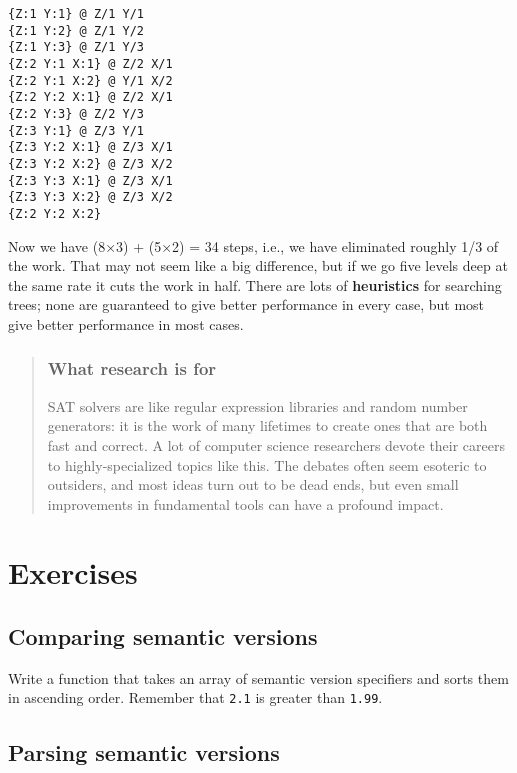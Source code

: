 \documentclass[krantzl]{krantz}
\newcommand{\glossref}[1]{\textbf{#1}}
\newenvironment{callout}{\savenotes\begin{tBox}\begin{quotation}\toggletrue{inbox}\renewcommand{\thempfootnote}{\arabic{footnote}}}{\end{quotation}\vspace{\baselineskip}\end{tBox}\togglefalse{inbox}\spewnotes}
\begin{document}
\begin{lstlisting}[frame=single,frameround=tttt]
{Z:1 Y:1} @ Z/1 Y/1
{Z:1 Y:2} @ Z/1 Y/2
{Z:1 Y:3} @ Z/1 Y/3
{Z:2 Y:1 X:1} @ Z/2 X/1
{Z:2 Y:1 X:2} @ Y/1 X/2
{Z:2 Y:2 X:1} @ Z/2 X/1
{Z:2 Y:3} @ Z/2 Y/3
{Z:3 Y:1} @ Z/3 Y/1
{Z:3 Y:2 X:1} @ Z/3 X/1
{Z:3 Y:2 X:2} @ Z/3 X/2
{Z:3 Y:3 X:1} @ Z/3 X/1
{Z:3 Y:3 X:2} @ Z/3 X/2
{Z:2 Y:2 X:2}
\end{lstlisting}



Now we have (8×3) + (5×2) = 34 steps,
i.e.,
we have eliminated roughly 1/3 of the work.
That may not seem like a big difference,
but if we go five levels deep at the same rate
it cuts the work in half.
There are lots of \glossref{heuristics} for searching trees;
none are guaranteed to give better performance in every case,
but most give better performance in most cases.

\begin{callout}


\subsubsection*{What research is for}


SAT solvers are like regular expression libraries and random number generators:
it is the work of many lifetimes to create ones that are both fast and correct.
A lot of computer science researchers devote their careers to highly-specialized topics like this.
The debates often seem esoteric to outsiders,
and most ideas turn out to be dead ends,
but even small improvements in fundamental tools can have a profound impact.

\end{callout}


\section{Exercises}\label{package-manager-exercises}

\subsection*{Comparing semantic versions}


Write a function that takes an array of semantic version specifiers
and sorts them in ascending order.
Remember that \texttt{2.1} is greater than \texttt{1.99}.

\subsection*{Parsing semantic versions}
\end{document}
